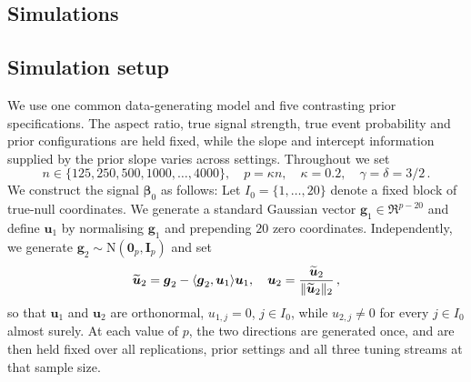 \documentclass{article}
\makeatletter
\theoremstyle{definition}
\newcommand{\vnorm}[1]{%
	\ensuremath{%
		\if@display
		\left\| #1 \right\|
		\else
		\| #1 \|
		\fi
	}%
}
\newcommand*{\bb}{\boldsymbol}
\def\bu{\bb{u}}
\def\bbeta{\bb{\beta}}
\let\mainmaketitle\maketitle
\let\main@maketitle\@maketitle
\let\main@title\@title
\let\main@author\@author
\let\main@date\@date
\let\main@thanks\@thanks
\let\mainthanks\thanks
\let\mainand\and
\makeatother
\begin{document}
\clearpage
\thispagestyle{empty}

\makeatletter
\edef\main@footnotevalue{\the\c@footnote}
\setcounter{footnote}{0}
\let\@maketitle\main@maketitle
\let\@title\main@title
\let\@author\main@author
\let\@date\main@date
\let\@thanks\main@thanks
\let\thanks\mainthanks
\let\and\mainand
\def\@title{Supplementary material document for:\\
\textit{\main@title}}
\mainmaketitle
\setcounter{footnote}{\main@footnotevalue}
\makeatother
\thispagestyle{empty}

\clearpage

\begin{bibunit}

\appendix


\section{Simulations}
\label{sec:simuls}

\subsection{Simulation setup}
\label{sec:simul-setup}

We use one common data-generating model and five contrasting prior
specifications. The aspect ratio, true signal strength, true event
probability and prior configurations are held fixed, while the slope and
intercept information supplied by the prior slope varies across settings.
Throughout we set 
$$
    n\in
    \{125,250,500,1000,\ldots,4000\},
    \quad
    p=\kappa n,
    \quad
    \kappa=0.2, \quad 
	\gamma = \delta = 3/2 \,.
$$
We construct the signal $\bbeta_0$ as follows: 
Let $I_0=\{1,\ldots,20\}$ denote a fixed block of true-null coordinates. We
generate a standard Gaussian vector $\bb g_1\in\Re^{p-20}$ and define
$\bu_1$ by normalising $\bb g_1$ and prepending $20$ zero coordinates.
Independently, we generate $\bb g_2\sim\mathrm N(\bb0_p,\bb I_p)$ and set
$$
    \widetilde{\bu}_2
    =
    \bb g_2
    -
    \langle\bb g_2,\bu_1\rangle\bu_1,
    \quad
    \bu_2
    =
    \frac{
        \widetilde{\bu}_2
    }{
        \vnorm{\widetilde{\bu}_2}_2
    }\,,
$$
so that $\bu_1$ and $\bu_2$ are orthonormal, $u_{1,j}=0$, $j\in I_0$, 
while $u_{2,j}\neq0$ for every
$j\in I_0$ almost surely. At each value of $p$, the two directions are
generated once, and are then held fixed over all
replications, prior settings and all three tuning streams at that sample size.


\end{bibunit}
\end{document}

